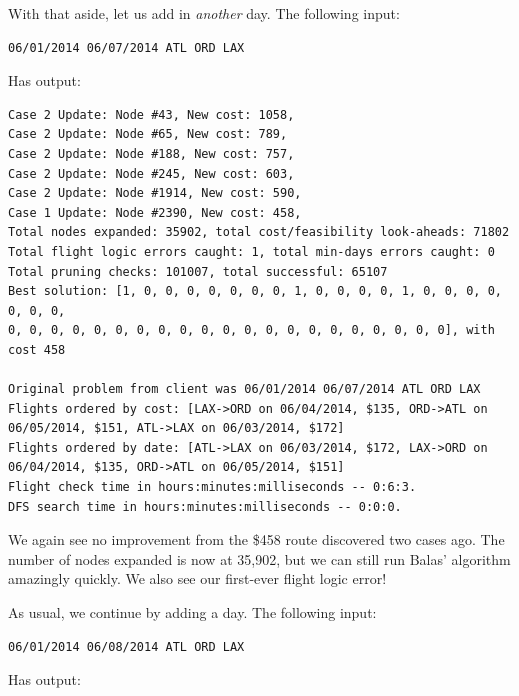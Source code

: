 \documentclass{article}
\begin{document}
With that aside, let us add in \emph{another} day. The following input:

\begin{verbatim}
06/01/2014 06/07/2014 ATL ORD LAX
\end{verbatim}

Has output:

\scriptsize
\begin{verbatim}
Case 2 Update: Node #43, New cost: 1058, 
Case 2 Update: Node #65, New cost: 789, 
Case 2 Update: Node #188, New cost: 757, 
Case 2 Update: Node #245, New cost: 603, 
Case 2 Update: Node #1914, New cost: 590, 
Case 1 Update: Node #2390, New cost: 458, 
Total nodes expanded: 35902, total cost/feasibility look-aheads: 71802
Total flight logic errors caught: 1, total min-days errors caught: 0
Total pruning checks: 101007, total successful: 65107
Best solution: [1, 0, 0, 0, 0, 0, 0, 0, 1, 0, 0, 0, 0, 1, 0, 0, 0, 0, 0, 0, 0, 
0, 0, 0, 0, 0, 0, 0, 0, 0, 0, 0, 0, 0, 0, 0, 0, 0, 0, 0, 0, 0], with cost 458

Original problem from client was 06/01/2014 06/07/2014 ATL ORD LAX
Flights ordered by cost: [LAX->ORD on 06/04/2014, $135, ORD->ATL on 06/05/2014, $151, ATL->LAX on 06/03/2014, $172]
Flights ordered by date: [ATL->LAX on 06/03/2014, $172, LAX->ORD on 06/04/2014, $135, ORD->ATL on 06/05/2014, $151]
Flight check time in hours:minutes:milliseconds -- 0:6:3.
DFS search time in hours:minutes:milliseconds -- 0:0:0.
\end{verbatim}
\normalsize

We again see no improvement from the \$458 route discovered two cases ago. The number of nodes expanded is now at 35,902, but we can still run Balas'
algorithm amazingly quickly. We also see our first-ever flight logic error!

As usual, we continue by adding a day. The following input:

\begin{verbatim}
06/01/2014 06/08/2014 ATL ORD LAX
\end{verbatim}

Has output:
\end{document}
